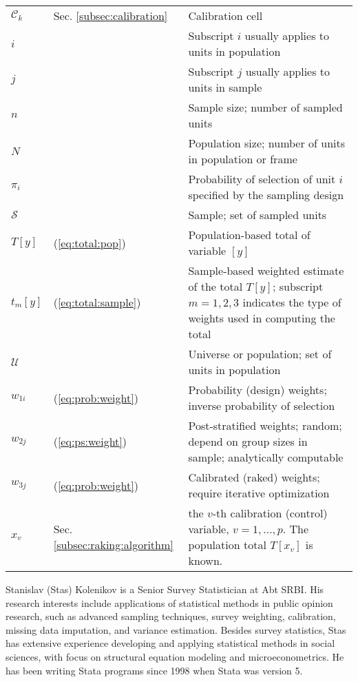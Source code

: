 \begin{tabular}{llp{9.5cm}}
    $\mathcal{C}_k$ & Sec. \ref{subsec:calibration} & Calibration cell \\
    $i$ & & Subscript $i$ usually applies to units in population \\
    $j$ & & Subscript $j$ usually applies to units in sample \\
    $n$ & & Sample size; number of sampled units \\
    $N$ & & Population size; number of units in population or frame \\
    $\pi_i$ & & Probability of selection of unit $i$
            specified by the sampling design \\
%
    $\mathcal{S}$ & & Sample; set of sampled units \\
    $T[y]$ & (\ref{eq:total:pop}) & Population-based total of variable $[y]$ \\
    $t_m[y]$ & (\ref{eq:total:sample}) & Sample-based weighted estimate of the total
        $T[y]$; subscript $m=1,2,3$ indicates the type of weights used in computing
        the total \\
    $\mathcal{U}$ & & Universe or population; set of units in population \\
%
    $w_{1i}$ & (\ref{eq:prob:weight}) & Probability (design) weights;
        inverse probability of selection \\
    $w_{2j}$ & (\ref{eq:ps:weight}) & Post-stratified weights;
        random; depend on group sizes in sample; analytically computable \\
    $w_{3j}$ & (\ref{eq:prob:weight}) & Calibrated (raked) weights;
        require iterative optimization \\
%
    $x_v$ & Sec. \ref{subsec:raking:algorithm} & the $v$-th calibration (control)
        variable, $v=1,\ldots,p$. The population total $T[x_v]$ is known. \\
\end{tabular}

\begin{aboutauthor}
  Stanislav (Stas) Kolenikov is a Senior Survey Statistician at Abt SRBI.
  His research interests include
  applications of statistical methods in public opinion research,
  such as advanced sampling techniques, survey weighting,
  calibration, missing data imputation, and variance estimation.
  Besides survey statistics, Stas has extensive experience developing and applying
  statistical methods in social sciences, with focus on structural equation
  modeling and microeconometrics. He has been writing Stata programs since
  1998 when Stata was version 5.
\end{aboutauthor}
